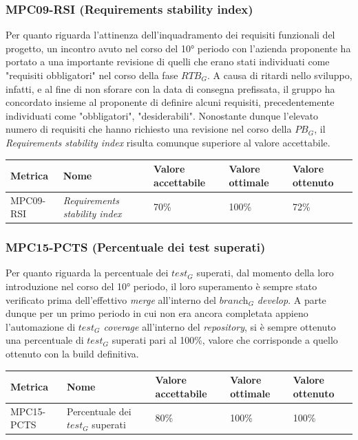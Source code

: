 \subsubsection{MPC09-RSI (Requirements stability index)}
Per quanto riguarda l'attinenza dell'inquadramento dei requisiti funzionali del progetto, un incontro avuto nel corso del 10° periodo con l'azienda proponente ha portato a una importante revisione di quelli che erano stati individuati come "requisiti obbligatori" nel corso della fase $\textit{RTB}_G$. A causa di ritardi nello sviluppo, infatti, e al fine di non sforare con la data di consegna prefissata, il gruppo ha concordato insieme al proponente di definire alcuni requisiti, precedentemente individuati come "obbligatori", "desiderabili". Nonostante dunque l'elevato numero di requisiti che hanno richiesto una revisione nel corso della $\textit{PB}_G$, il \textit{Requirements stability index} risulta comunque superiore al valore accettabile. 
\begin{center}
    \begin{tabular}{|p{3cm}|p{4cm}|p{3cm}|p{3cm}|p{3cm}|}
    \hline
    \textbf{Metrica} & \textbf{Nome} & \textbf{Valore \newline accettabile} & \textbf{Valore \newline ottimale} & \textbf{Valore \newline ottenuto} \\
    \hline
    MPC09-RSI & \textit{Requirements stability index} & 70\% & 100\% & 72\% \\
    \hline
    \end{tabular}
\end{center}
\subsubsection{MPC15-PCTS (Percentuale dei test superati)}
Per quanto riguarda la percentuale dei $\textit{test}_G$ superati, dal momento della loro introduzione nel corso del 10° periodo, il loro superamento è sempre stato verificato prima dell'effettivo \textit{merge} all'interno del $\textit{branch}_G$ \textit{develop}. A parte dunque per un primo periodo in cui non era ancora completata appieno l'automazione di \textit{$\textit{test}_G$ coverage} all'interno del \textit{repository}, si è sempre ottenuto una percentuale di $\textit{test}_G$ superati pari al 100\%, valore che corrisponde a quello ottenuto con la build definitiva. 
\begin{center}
    \begin{tabular}{|p{3cm}|p{4cm}|p{3cm}|p{3cm}|p{3cm}|}
    \hline
    \textbf{Metrica} & \textbf{Nome} & \textbf{Valore \newline accettabile} & \textbf{Valore \newline ottimale} & \textbf{Valore \newline ottenuto} \\
    \hline
    MPC15-PCTS & Percentuale dei $\textit{test}_G$ superati & 80\% & 100\% & 100\% \\
    \hline
    \end{tabular}
\end{center}

